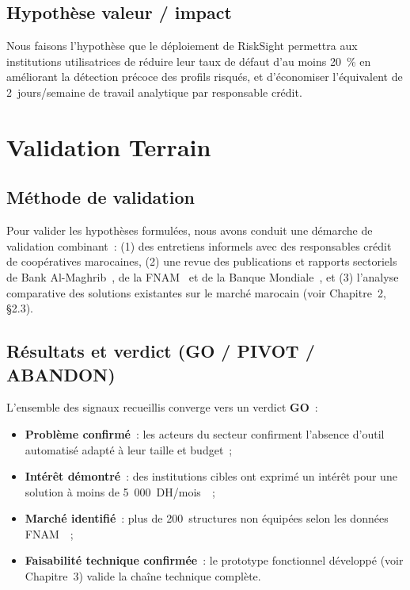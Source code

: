 \documentclass[12pt, a4paper]{report}
\begin{document}
\subsection{Hypothèse valeur / impact}

\begin{tcolorbox}[successbox,title={Hypothèse Valeur}]
Nous faisons l'hypothèse que le déploiement de RiskSight permettra aux institutions
utilisatrices de réduire leur taux de défaut d'au moins 20~\% en améliorant la
détection précoce des profils risqués, et d'économiser l'équivalent de 2~jours/semaine
de travail analytique par responsable crédit.
\end{tcolorbox}

\section{Validation Terrain}

\subsection{Méthode de validation}

Pour valider les hypothèses formulées, nous avons conduit une démarche de
validation combinant~: (1) des entretiens informels avec des responsables crédit
de coopératives marocaines, (2) une revue des publications et rapports sectoriels
de Bank Al-Maghrib~\cite{bam_rapport}, de la FNAM~\cite{fnam} et de la Banque
Mondiale~\cite{worldbank}, et (3) l'analyse comparative des solutions existantes
sur le marché marocain (voir Chapitre~2, §2.3).

\subsection{Résultats et verdict (GO / PIVOT / ABANDON)}

\begin{tcolorbox}[successbox,title={Verdict de Validation Terrain : GO}]
L'ensemble des signaux recueillis converge vers un verdict \textbf{GO}~:
\begin{itemize}
  \item \textbf{Problème confirmé}~: les acteurs du secteur confirment l'absence
    d'outil automatisé adapté à leur taille et budget~;
  \item \textbf{Intérêt démontré}~: des institutions cibles ont exprimé un intérêt
    pour une solution à moins de 5~000~DH/mois~\cite{tp3_faisabilite}~;
  \item \textbf{Marché identifié}~: plus de 200~structures non équipées selon les
    données FNAM~\cite{fnam}~;
  \item \textbf{Faisabilité technique confirmée}~: le prototype fonctionnel développé
    (voir Chapitre~3) valide la chaîne technique complète.
\end{itemize}
\end{tcolorbox}
\end{document}
